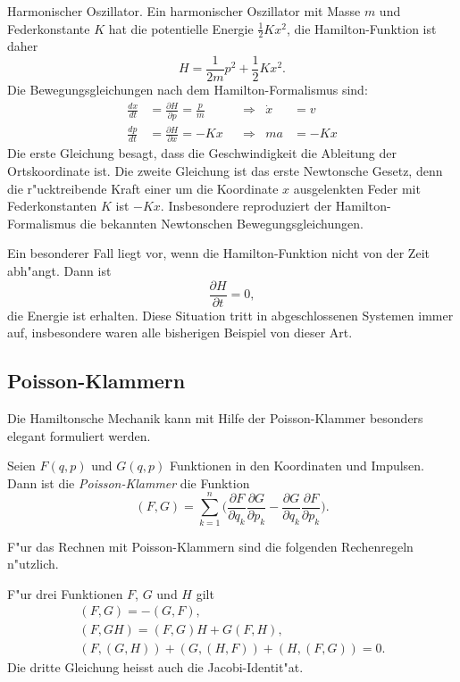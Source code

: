 \begin{beispiel} Harmonischer Oszillator. Ein harmonischer Oszillator
mit Masse $m$ und Federkonstante $K$ hat die potentielle Energie $\frac12Kx^2$,
die Hamilton-Funktion ist daher
\[
H=\frac1{2m}p^2+\frac12Kx^2.
\]
Die Bewegungsgleichungen nach dem Hamilton-Formalismus sind:
\begin{align*}
\frac{dx}{dt}&=\frac{\partial H}{\partial p}=\frac{p}{m}&&\Rightarrow&\dot x&=v\\
\frac{dp}{dt}&=\frac{\partial H}{\partial x}=-Kx&&\Rightarrow&ma&=-Kx
\end{align*}
Die erste Gleichung besagt, dass die Geschwindigkeit die Ableitung
der Ortskoordinate ist.
Die zweite Gleichung ist das erste Newtonsche Gesetz, denn die
r"ucktreibende Kraft einer um die Koordinate $x$ ausgelenkten Feder
mit Federkonstanten $K$ ist $-Kx$.
Insbesondere reproduziert der Hamilton-Formalismus die bekannten
Newtonschen Bewegungsgleichungen.
\end{beispiel}

Ein besonderer Fall liegt vor, wenn die Hamilton-Funktion nicht von
der Zeit abh"angt. Dann ist
\[
\frac{\partial H}{\partial t}=0,
\]
die Energie ist erhalten. Diese Situation tritt in abgeschlossenen
Systemen immer auf, insbesondere waren alle bisherigen Beispiel
von dieser Art.

\subsection{Poisson-Klammern}
Die Hamiltonsche Mechanik kann mit Hilfe der Poisson-Klammer besonders
elegant formuliert werden.

\begin{definition}
Seien $F(q,p)$ und $G(q,p)$ Funktionen in den Koordinaten und Impulsen. 
Dann ist die {\em Poisson-Klammer} die Funktion
\[
(F,G)
=
\sum_{k=1}^n
\biggl(
\frac{\partial F}{\partial q_k}\frac{\partial G}{\partial p_k}
-
\frac{\partial G}{\partial q_k}\frac{\partial F}{\partial p_k}
\biggr).
\]
\end{definition}

F"ur das Rechnen mit Poisson-Klammern sind die folgenden Rechenregeln
n"utzlich.
\begin{satz}
F"ur drei Funktionen $F$, $G$ und $H$ gilt
\begin{gather*}
(F,G)=-(G,F),
\\
(F,GH)
=
(F,G)H+G(F,H),
\\
(F,(G,H))
+
(G,(H,F))
+
(H,(F,G))
=0.
\end{gather*}
Die dritte Gleichung heisst auch die Jacobi-Identit"at.
\end{satz}

